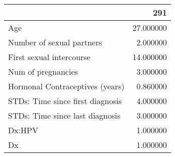 \begin{tabular}{lr}
\toprule
 & 291 \\
\midrule
Age & 27.000000 \\
Number of sexual partners & 2.000000 \\
First sexual intercourse & 14.000000 \\
Num of pregnancies & 3.000000 \\
Hormonal Contraceptives (years) & 0.860000 \\
STDs: Time since first diagnosis & 4.000000 \\
STDs: Time since last diagnosis & 3.000000 \\
Dx:HPV & 1.000000 \\
Dx & 1.000000 \\
\bottomrule
\end{tabular}
